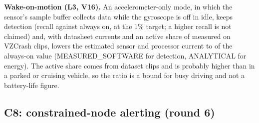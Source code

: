 \documentclass{ieeeaccess}
\begin{document}
\textbf{Wake-on-motion (L3, V16).} An accelerometer-only mode, in which the sensor's sample buffer collects data while the gyroscope is off in idle, keeps detection (recall \RFiveThreeRecB{} against \RFiveThreeRecA{} always on, at the 1\% target; a higher recall is not claimed) and, with datasheet currents and an active share of \RFiveThreeShare{} measured on VZCrash clips, lowers the estimated sensor and processor current to \RFiveThreeRatio{} of the always-on value (MEASURED\_SOFTWARE for detection, ANALYTICAL for energy). The active share comes from dataset clips and is probably higher than in a parked or cruising vehicle, so the ratio is a bound for busy driving and not a battery-life figure.

\subsection{C8: constrained-node alerting (round 6)}
\label{sec:c8}
\end{document}
